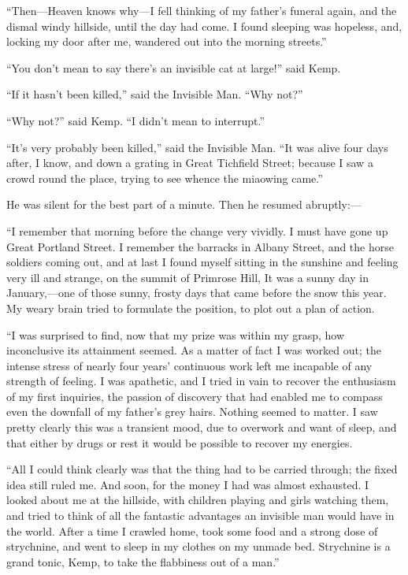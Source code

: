 “Then—Heaven knows why—I fell thinking of my father’s funeral again, and the dismal windy hillside, until the day had come. I found sleeping was hopeless, and, locking my door after me, wandered out into the morning streets.”

“You don’t mean to say there’s an invisible cat at large!” said Kemp.

“If it hasn’t been killed,” said the Invisible Man. “Why not?”

“Why not?” said Kemp. “I didn’t mean to interrupt.”

“It’s very probably been killed,” said the Invisible Man. “It was alive four days after, I know, and down a grating in Great Tichfield Street; because I saw a crowd round the place, trying to see whence the miaowing came.”

He was silent for the best part of a minute. Then he resumed abruptly:—

“I remember that morning before the change very vividly. I must have gone up Great Portland Street. I remember the barracks in Albany Street, and the horse soldiers coming out, and at last I found myself sitting in the sunshine and feeling very ill and strange, on the summit of Primrose Hill, It was a sunny day in January,—one of those sunny, frosty days that came before the snow this year. My weary brain tried to formulate the position, to plot out a plan of action.

“I was surprised to find, now that my prize was within my grasp, how inconclusive its attainment seemed. As a matter of fact I was worked out; the intense stress of nearly four years’ continuous work left me incapable of any strength of feeling. I was apathetic, and I tried in vain to recover the enthusiasm of my first inquiries, the passion of discovery that had enabled me to compass even the downfall of my father’s grey hairs. Nothing seemed to matter. I saw pretty clearly this was a transient mood, due to overwork and want of sleep, and that either by drugs or rest it would be possible to recover my energies.

“All I could think clearly was that the thing had to be carried through; the fixed idea still ruled me. And soon, for the money I had was almost exhausted. I looked about me at the hillside, with children playing and girls watching them, and tried to think of all the fantastic advantages an invisible man would have in the world. After a time I crawled home, took some food and a strong dose of strychnine, and went to sleep in my clothes on my unmade bed. Strychnine is a grand tonic, Kemp, to take the flabbiness out of a man.”

